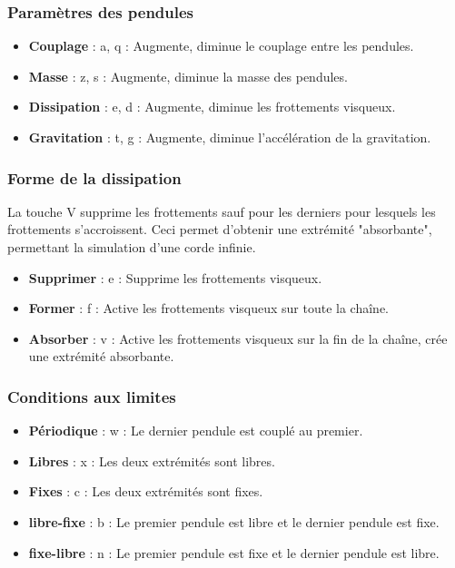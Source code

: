 \subsubsection{Paramètres des pendules}
%
\begin{itemize}[label=, leftmargin=2cm, itemsep=0pt]
\item {\bf Couplage} : {\sf a}, {\sf q} : Augmente, diminue le couplage entre les pendules.
\item {\bf Masse} : {\sf z}, {\sf s} :  Augmente, diminue la masse des pendules.
\item {\bf Dissipation} : {\sf e}, {\sf d} :  Augmente, diminue les frottements visqueux.
\item {\bf Gravitation} : {\sf t}, {\sf g} :  Augmente, diminue l'accélération de la gravitation.
\end{itemize}
%
%
\subsubsection{Forme de la dissipation}
%
La touche {\sf V} supprime les frottements sauf pour les derniers pour lesquels les frottements s'accroissent. Ceci permet d'obtenir une extrémité "absorbante", permettant la simulation d'une corde infinie.
%
\begin{itemize}[label=, leftmargin=2cm, itemsep=0pt]
\item {\bf Supprimer} : {\sf e} : Supprime les frottements visqueux.
\item {\bf Former} : {\sf f} : Active les frottements visqueux sur toute la chaîne.
\item {\bf Absorber} : {\sf v} : Active les frottements visqueux sur la fin de la chaîne, crée une extrémité absorbante.
\end{itemize}
%
%
\subsubsection{Conditions aux limites}
%
\begin{itemize}[label=, leftmargin=2cm, itemsep=0pt]
\item {\bf Périodique} : {\sf w} : Le dernier pendule est couplé au premier.
\item {\bf Libres} : {\sf x} : Les deux extrémités sont libres.
\item {\bf Fixes} : {\sf c} : Les deux extrémités sont fixes.
\item {\bf libre-fixe} : {\sf b} : Le premier pendule est libre et le dernier pendule est fixe.
\item {\bf fixe-libre} : {\sf n} : Le premier pendule est fixe et le dernier pendule est libre.
\end{itemize}
%
%
